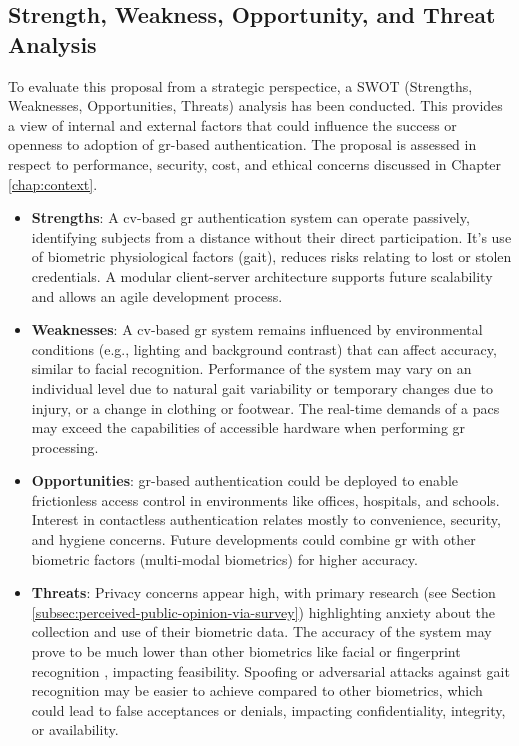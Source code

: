 \subsection{Strength, Weakness, Opportunity, and Threat Analysis}

To evaluate this proposal from a strategic perspectice, a SWOT (Strengths, Weaknesses, Opportunities, Threats) analysis has been conducted.
This provides a view of internal and external factors that could influence the success or openness to adoption of \ac{gr}-based authentication.
The proposal is assessed in respect to performance, security, cost, and ethical concerns discussed in Chapter \ref{chap:context}.

\begin{itemize}
    \item \textbf{Strengths}: A \ac{cv}-based \ac{gr} authentication system can operate passively, identifying subjects from a distance without their direct participation.
          It's use of biometric physiological factors (gait), reduces risks relating to lost or stolen credentials.
          A modular client-server architecture supports future scalability and allows an agile development process.

    \item \textbf{Weaknesses}: A \ac{cv}-based \ac{gr} system remains influenced by environmental conditions (e.g., lighting and background contrast) that can affect accuracy, similar to facial recognition.
          Performance of the system may vary on an individual level due to natural gait variability or temporary changes due to injury, or a change in clothing or footwear.
          The real-time demands of a \ac{pacs} may exceed the capabilities of accessible hardware when performing \ac{gr} processing.

    \item \textbf{Opportunities}:
          \ac{gr}-based authentication could be deployed to enable frictionless access control in environments like offices, hospitals, and schools.
          Interest in contactless authentication relates mostly to convenience, security, and hygiene concerns.
          Future developments could combine \ac{gr} with other biometric factors (multi-modal biometrics) for higher accuracy.

    \item \textbf{Threats}:
          Privacy concerns appear high, with primary research (see Section \ref{subsec:perceived-public-opinion-via-survey}) highlighting anxiety about the collection and use of their biometric data.
          The accuracy of the system may prove to be much lower than other biometrics like facial or fingerprint recognition \parencite{nationalinstituteofstandardsandtechnologyNISTEvaluatesFace2021,nationalinstituteofstandardsandtechnologyNISTStudyShows2004}, impacting feasibility.
          Spoofing or adversarial attacks against gait recognition may be easier to achieve compared to other biometrics, which could lead to false acceptances or denials, impacting confidentiality, integrity, or availability.

\end{itemize}
